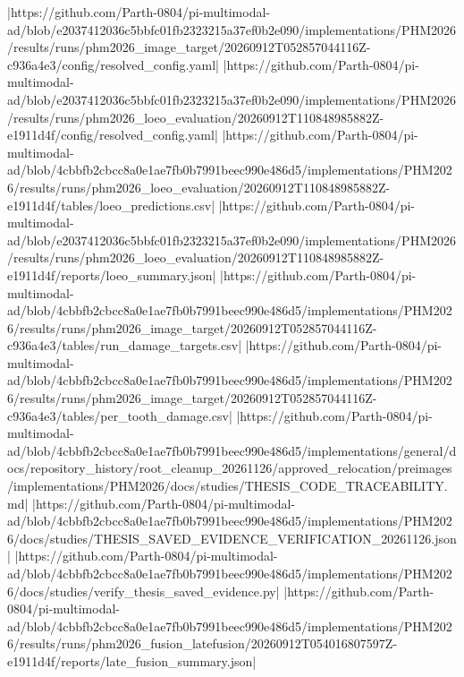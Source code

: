 |https://github.com/Parth-0804/pi-multimodal-ad/blob/e2037412036c5bbfc01fb2323215a37ef0b2e090/implementations/PHM2026/results/runs/phm2026_image_target/20260912T052857044116Z-c936a4e3/config/resolved_config.yaml|
|https://github.com/Parth-0804/pi-multimodal-ad/blob/e2037412036c5bbfc01fb2323215a37ef0b2e090/implementations/PHM2026/results/runs/phm2026_loeo_evaluation/20260912T110848985882Z-e1911d4f/config/resolved_config.yaml|
|https://github.com/Parth-0804/pi-multimodal-ad/blob/4cbbfb2cbcc8a0e1ae7fb0b7991beec990e486d5/implementations/PHM2026/results/runs/phm2026_loeo_evaluation/20260912T110848985882Z-e1911d4f/tables/loeo_predictions.csv|
|https://github.com/Parth-0804/pi-multimodal-ad/blob/e2037412036c5bbfc01fb2323215a37ef0b2e090/implementations/PHM2026/results/runs/phm2026_loeo_evaluation/20260912T110848985882Z-e1911d4f/reports/loeo_summary.json|
|https://github.com/Parth-0804/pi-multimodal-ad/blob/4cbbfb2cbcc8a0e1ae7fb0b7991beec990e486d5/implementations/PHM2026/results/runs/phm2026_image_target/20260912T052857044116Z-c936a4e3/tables/run_damage_targets.csv|
|https://github.com/Parth-0804/pi-multimodal-ad/blob/4cbbfb2cbcc8a0e1ae7fb0b7991beec990e486d5/implementations/PHM2026/results/runs/phm2026_image_target/20260912T052857044116Z-c936a4e3/tables/per_tooth_damage.csv|
|https://github.com/Parth-0804/pi-multimodal-ad/blob/4cbbfb2cbcc8a0e1ae7fb0b7991beec990e486d5/implementations/general/docs/repository_history/root_cleanup_20261126/approved_relocation/preimages/implementations/PHM2026/docs/studies/THESIS_CODE_TRACEABILITY.md|
|https://github.com/Parth-0804/pi-multimodal-ad/blob/4cbbfb2cbcc8a0e1ae7fb0b7991beec990e486d5/implementations/PHM2026/docs/studies/THESIS_SAVED_EVIDENCE_VERIFICATION_20261126.json|
|https://github.com/Parth-0804/pi-multimodal-ad/blob/4cbbfb2cbcc8a0e1ae7fb0b7991beec990e486d5/implementations/PHM2026/docs/studies/verify_thesis_saved_evidence.py|
|https://github.com/Parth-0804/pi-multimodal-ad/blob/4cbbfb2cbcc8a0e1ae7fb0b7991beec990e486d5/implementations/PHM2026/results/runs/phm2026_fusion_latefusion/20260912T054016807597Z-e1911d4f/reports/late_fusion_summary.json|
